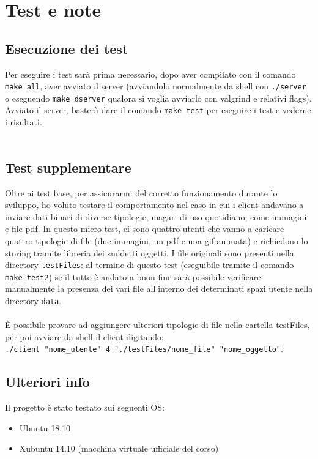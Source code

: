 \section{Test e note}
\begin{flushleft}

\subsection{Esecuzione dei test}
Per eseguire i test sarà prima necessario, dopo aver compilato con il comando \texttt{make all}, aver avviato il server (avviandolo normalmente da shell con \texttt{./server} o eseguendo \texttt{make dserver} qualora si voglia avviarlo con valgrind e relativi flags).\\
Avviato il server, basterà dare il comando \texttt{make test} per eseguire i test e vederne i risultati.\\~\\

\subsection{Test supplementare}
Oltre ai test base, per assicurarmi del corretto funzionamento durante lo sviluppo, ho voluto testare il comportamento nel caso in cui i client andavano a inviare dati binari di diverse tipologie, magari di uso quotidiano, come immagini e file pdf. In questo micro-test, ci sono quattro utenti che vanno a caricare quattro tipologie di file (due immagini, un pdf e una gif animata) e richiedono lo storing tramite libreria dei suddetti oggetti. I file originali sono presenti nella directory \texttt{testFiles}: al termine di questo test (eseguibile tramite il comando \texttt{make test2}) se il tutto è andato a buon fine sarà possibile verificare manualmente la presenza dei vari file all'interno dei determinati spazi utente nella directory \texttt{data}.\\~\\
È possibile provare ad aggiungere ulteriori tipologie di file nella cartella testFiles, per poi avviare da shell il client digitando:\\ \texttt{./client "nome\_utente" 4 "./testFiles/nome\_file" "nome\_oggetto"}.

\subsection{Ulteriori info}
Il progetto è stato testato sui seguenti OS:
\begin{itemize}
\item Ubuntu 18.10
\item Xubuntu 14.10 (macchina virtuale ufficiale del corso)
\end{itemize}

\end{flushleft}


